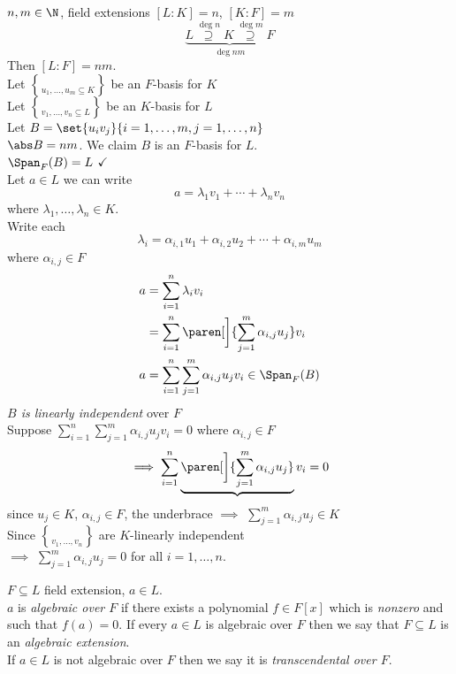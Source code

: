 \lem $n,m\in\N$, field extensions $[L:K]=n$, $[K:F]=m$
\[ \underbrace{L \overset{\deg n}{\supseteq} K \overset{\deg m}{\supseteq} F}_{\deg nm} \]
Then $[L:F]=nm$. \\
\pf Let $\brace{u_1,\dotsc,u_m}\subseteq K$ be an $F$-basis for $K$ \\
Let $\brace{v_1,\dotsc,v_n}\subseteq L$ be an $K$-basis for $L$ \\
Let $B=\set{u_iv_j}{i=1,\dotsc,m,j=1,\dotsc,n}$ \\
$\abs B=nm$.  We claim $B$ is an $F$-basis for $L$. \\
\emph{$\Span_F(B)=L$} $\checkmark$ \\
Let $a\in L$ we can write
\[ a = \lambda_1v_1+\dotsb+\lambda_nv_n \]
where $\lambda_1,\dotsc,\lambda_n\in K$. \\
Write each
\[ \lambda_i = \alpha_{i,1}u_1 + \alpha_{i,2}u_2 + \dotsb + \alpha_{i,m}u_m \]
where $\alpha_{i,j}\in F$
\begin{align*}
a &= \sum_{i=1}^n \lambda_i v_i \\
&= \sum_{i=1}^n \paren[\bigg]{\sum_{j=1}^m \alpha_{i,j}u_j} v_i \\
a &= \sum_{i=1}^n \sum_{j=1}^m \alpha_{i,j} u_j v_i \in \Span_F(B)
\end{align*}
\emph{$B$ is linearly independent} over $F$ \\
Suppose $\sum_{i=1}^n\sum_{j=1}^m\alpha_{i,j}u_jv_i=0$ where $\alpha_{i,j}\in F$ \\
\[ \implies \sum_{i=1}^n \underbrace{\paren[\bigg]{\sum_{j=1}^m \alpha_{i,j}u_j}} v_i = 0 \]
since $u_j\in K$, $\alpha_{i,j}\in F$, the underbrace $\implies$ $\sum_{j=1}^m \alpha_{i,j}u_j\in K$ \\
Since $\brace{v_1,\dotsc,v_n}$ are $K$-linearly independent \\
$\implies$ $\sum_{j=1}^m \alpha_{i,j}u_j=0$ for all $i=1,\dotsc,n$.

 $F\subseteq L$ field extension, $a\in L$. \\
$a$ is \emph{algebraic over $F$} if there exists a polynomial $f\in F[x]$ which is \emph{nonzero} and such that $f(a)=0$.  If every $a\in L$ is algebraic over $F$ then we say that $F\subseteq L$ is an \emph{algebraic extension}. \\
If $a\in L$ is not algebraic over $F$ then we say it is \emph{transcendental over $F$}.

